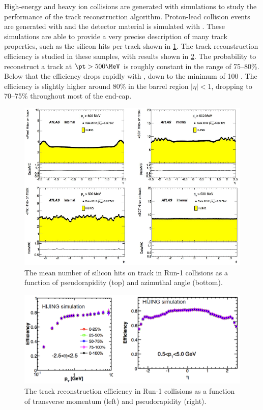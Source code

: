 High-energy \pp and heavy ion collisions are generated with \mc simulations to study the performance of the track reconstruction algorithm.
Proton-lead collision events are generated with \Hijing \cite{Gyulassy:1994ew} and the detector material is simulated with \GEANTFour \cite{Agostinelli:2002hh}.
These simulations are able to provide a very precise description of many track properties, such as the silicon hits per track shown in \cref{fig:trk_si_hits}.
The track reconstruction efficiency is studied in these \mc samples, with results shown in \cref{fig:trk_eff}.
The probability to reconstruct a track at $\pt > 500 \MeV$ is roughly constant in the range of 75--80\%.
Below that the efficiency drops rapidly with \pt, down to the minimum of 100 \MeV.
The efficiency is slightly higher around 80\% in the barrel region $|\eta| < 1$, dropping to 70--75\% throughout most of the end-cap.

\begin{figure}[t]
  \includegraphics[width=\linewidth]{ATL-COM-PHYS-2013-1017_sihits.png}
  \caption{The mean number of silicon hits on track in Run-1 \pPb collisions as a function of pseudorapidity (top) and azimuthal angle (bottom).}
  \label{fig:trk_si_hits}
\end{figure}

\begin{figure}[t]
  \includegraphics[width=\linewidth]{ATL-COM-PHYS-2013-011_trk_eff.png}
  \caption{The track reconstruction efficiency in Run-1 \pPb collisions as a function of transverse momentum (left) and pseudorapidity (right).}
  \label{fig:trk_eff}
\end{figure}

